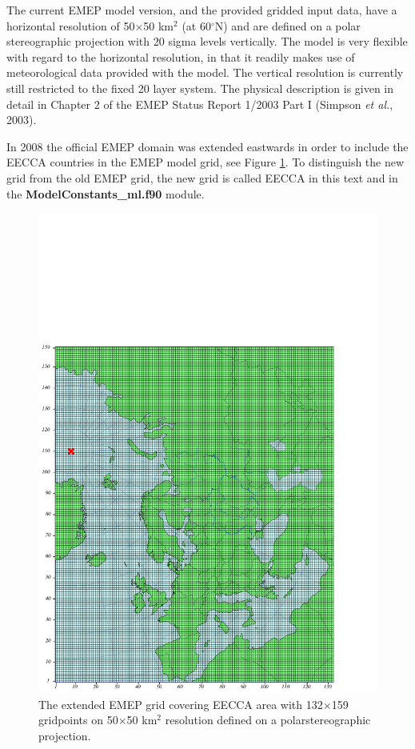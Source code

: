The current EMEP model version, and the provided gridded input data,
have a horizontal resolution of 50$\times$50 km$^2$ (at 60$^\circ$N)
and are defined on a
polar stereographic projection with 20 sigma levels vertically. 
The model is very flexible with regard to the horizontal
resolution, in that it readily makes use of 
meteorological data provided with the model. The vertical
resolution is currently still restricted to the fixed 20 layer
system. The physical
description is given in detail in Chapter 2 of the EMEP Status Report
1/2003 Part I (Simpson {\sl et al.}, 2003).

In 2008 the official EMEP domain was extended eastwards in order to include the 
EECCA countries in the EMEP model grid, see Figure \ref{fig:EECCA}. To distinguish the new grid from the old EMEP 
grid, the new grid is called EECCA in this text and in the { \bf ModelConstants\_ml.f90} module.

\begin{figure}[ht]
 \centering
\includegraphics[scale=0.7]{EECCA}
\caption{The extended EMEP grid covering EECCA area with
132$\times$159 gridpoints on 50$\times$50 km$^2$ resolution defined on a polarstereographic
projection.}\label{fig:EECCA}
\end{figure}


